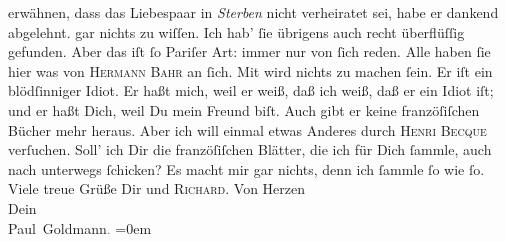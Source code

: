 \begin{ledgroupsized}[t]{13cm}
{{{                  erwähnen, dass das Liebespaar in \emph{Sterben}
                  nicht verheiratet sei, habe er dankend abgelehnt.}}}\label{K_L02738-6h} gar nichts zu wiſſen. Ich
               hab’ ſie {\pb}übrigens auch recht überflüſſig gefunden.
               Aber das iſt ſo Pariſer Art: immer nur von ſich
               reden. Alle haben ſie hier was von \textsc{Hermann Bahr} an ſich.\pend
           \pstart
           Mit \label{K_L02738-7v}\label{K_L02738-7h} wird nichts zu machen ſein. Er iſt ein blödſinniger Idiot. Er haßt mich, weil
               er weiß, daß ich weiß, daß er ein Idiot iſt; und er {\pb}haßt Dich, weil Du mein Freund biſt. Auch gibt er keine franzöſiſchen Bücher mehr
               heraus. Aber ich will einmal etwas Anderes durch \textsc{Henri Becque} verſuchen.\pend
           \pstart
           Soll’ ich Dir die franzöſiſchen
               Blätter, die ich für Dich ſammle, auch nach unterwegs ſchicken? Es macht mir gar
               nichts, denn ich ſammle ſo wie ſo.\pend
           \pstart
           Viele treue Grüße Dir und \textsc{Richard}. Von Herzen {\\[\baselineskip]}Dein {\\[\baselineskip]}\spacefill\mbox{Paul Goldmann\textcolor{gray}{.}}\pend
           \leftskip=0em{}
         
         \endnumbering{}\end{ledgroupsized}  \newcommand{\dateiname}{L02738}\newcommand{\titel}{Paul Goldmann an Arthur Schnitzler, 29. 6. [1895]}\newcommand{\editorInnen}{Martin Anton Müller und Laura Untner}
      